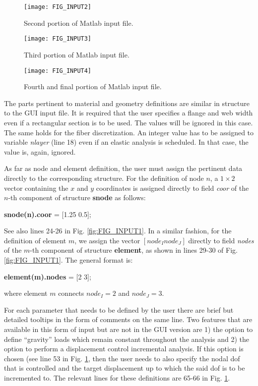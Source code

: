 \begin{appendices}
\begin{figure}
	\centering
	\texttt{[image: FIG\_INPUT2]}
	\caption{Second portion of Matlab input file.}
	\label{fig:FIG_INPUT2}
\end{figure}

\begin{figure}
	\centering
	\texttt{[image: FIG\_INPUT3]}
	\caption{Third portion of Matlab input file.}
	\label{fig:FIG_INPUT3}
\end{figure}

\begin{figure}
	\centering
	\texttt{[image: FIG\_INPUT4]}
	\caption{Fourth and final portion of Matlab input file.}
	\label{fig:FIG_INPUT4}
\end{figure}

The parts pertinent to material and geometry definitions are similar in 
structure to the GUI input file. It is required that the user specifies a 
flange and web width even if a rectangular section is to be used. The values 
will be ignored in this case. The same holds for the fiber discretization. An 
integer value has to be assigned to variable \textit{nlayer} (line 18) even if 
an elastic analysis is scheduled. In that case, the value is, again, ignored.

As far as node and element definition, the user must assign the pertinent data 
directly to the corresponding structure. For the definition of 
node $n$, a $1\times 2$ vector containing the $x$ and $y$ coordinates is 
assigned directly to field \textit{coor} of the $n$-th component of structure 
\textbf{snode} as follows:
\begin{center}
	\textbf{snode(n).coor} = [1.25 0.5];
\end{center}

\noindent See also lines 24-26 in Fig. \ref{fig:FIG_INPUT1}. In a similar 
fashion, for the definition of element $m$, we assign the vector $[node_I 
node_J]$ directly to field \textit{nodes} of the $m$-th component of structure 
\textbf{element}, as shown in lines 29-30 of Fig. \ref{fig:FIG_INPUT1}. The 
general format is:

\begin{center}
	\textbf{element(m).nodes} = [2 3];
\end{center}
\noindent where element $m$ connects $node_I=2$ and $node_J=3$.

For each parameter that needs to be defined by the user there are brief but 
detailed tooltips in the form of comments on the same line. Two features that 
are available in this form of input but are not in the GUI version are 1) the 
option to define ``gravity'' loads which remain constant throughout the 
analysis and 2) the option to perform a displacement control incremental 
analysis. If this option is chosen (see line 53 in Fig. \ref{fig:FIG_INPUT2}, 
then the user needs to also specify the nodal \acrshort{dof} that is controlled 
and the target displacement up to which the said \acrshort{dof} is to be 
incremented to. The relevant lines for these definitions are 65-66 in Fig. 
\ref{fig:FIG_INPUT2}.


\end{appendices}
